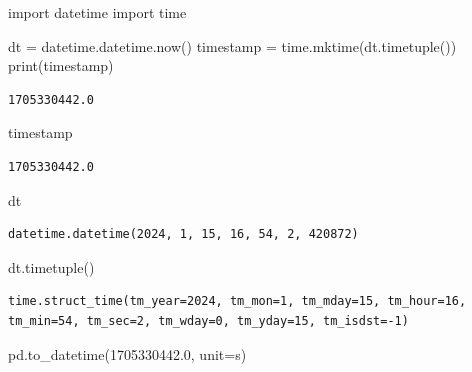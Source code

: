 \documentclass[
  letterpaper,
  DIV=11,
  numbers=noendperiod,
  oneside]{scrreprt}
\newenvironment{Shaded}{\begin{snugshade}}{\end{snugshade}}
\newcommand{\BuiltInTok}[1]{\textcolor[rgb]{0.00,0.23,0.31}{#1}}
\newcommand{\FloatTok}[1]{\textcolor[rgb]{0.68,0.00,0.00}{#1}}
\newcommand{\ImportTok}[1]{\textcolor[rgb]{0.00,0.46,0.62}{#1}}
\newcommand{\NormalTok}[1]{\textcolor[rgb]{0.00,0.23,0.31}{#1}}
\newcommand{\OperatorTok}[1]{\textcolor[rgb]{0.37,0.37,0.37}{#1}}
\newcommand{\StringTok}[1]{\textcolor[rgb]{0.13,0.47,0.30}{#1}}
\begin{document}
\begin{Shaded}
\begin{Highlighting}[]
\ImportTok{import}\NormalTok{ datetime}
\ImportTok{import}\NormalTok{ time}

\NormalTok{dt }\OperatorTok{=}\NormalTok{ datetime.datetime.now()}
\NormalTok{timestamp }\OperatorTok{=}\NormalTok{ time.mktime(dt.timetuple())}
\BuiltInTok{print}\NormalTok{(timestamp)}
\end{Highlighting}
\end{Shaded}

\begin{verbatim}
1705330442.0
\end{verbatim}

\begin{Shaded}
\begin{Highlighting}[]
\NormalTok{timestamp}
\end{Highlighting}
\end{Shaded}

\begin{verbatim}
1705330442.0
\end{verbatim}

\begin{Shaded}
\begin{Highlighting}[]
\NormalTok{dt}
\end{Highlighting}
\end{Shaded}

\begin{verbatim}
datetime.datetime(2024, 1, 15, 16, 54, 2, 420872)
\end{verbatim}

\begin{Shaded}
\begin{Highlighting}[]
\NormalTok{dt.timetuple()}
\end{Highlighting}
\end{Shaded}

\begin{verbatim}
time.struct_time(tm_year=2024, tm_mon=1, tm_mday=15, tm_hour=16, tm_min=54, tm_sec=2, tm_wday=0, tm_yday=15, tm_isdst=-1)
\end{verbatim}

\begin{Shaded}
\begin{Highlighting}[]
\NormalTok{pd.to\_datetime(}\FloatTok{1705330442.0}\NormalTok{, unit}\OperatorTok{=}\StringTok{\textquotesingle{}s\textquotesingle{}}\NormalTok{)}
\end{Highlighting}
\end{Shaded}
\end{document}
